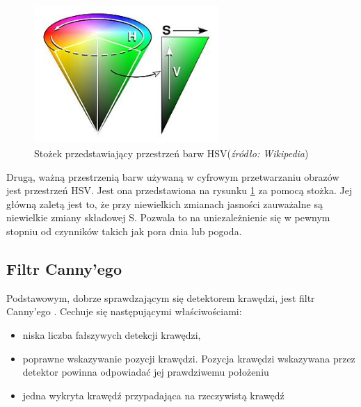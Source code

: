 \begin{figure}
  \centering
  \includegraphics[width=7cm]{img/hsv.jpg}
  \caption{Stożek przedstawiający przestrzeń barw HSV(\textit{źródło: Wikipedia})}
  \label{fig:hsv}
\end{figure}

Drugą, ważną przestrzenią barw używaną w cyfrowym przetwarzaniu obrazów jest przestrzeń HSV. 
Jest ona przedstawiona na rysunku \ref{fig:hsv} za pomocą stożka. 
Jej główną zaletą jest to, że przy niewielkich zmianach jasności zauważalne są niewielkie zmiany składowej S. %
Pozwala to na uniezależnienie się w pewnym stopniu od czynników takich jak pora dnia lub pogoda.

\subsection{Filtr Canny'ego}
Podstawowym, dobrze sprawdzającym się detektorem krawędzi, jest filtr Canny'ego \cite{T5}. 
Cechuje się następującymi właściwościami: %

\begin{itemize}
\item niska liczba fałszywych detekcji krawędzi,
\item poprawne wskazywanie pozycji krawędzi. Pozycja krawędzi wskazywana przez detektor powinna odpowiadać jej prawdziwemu położeniu
\item jedna wykryta krawędź przypadająca na rzeczywistą krawędź
\end{itemize}

